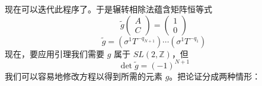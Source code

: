 现在可以迭代此程序了。于是辗转相除法蕴含矩阵恒等式
\begin{equation}
  \tilde g\begin{pmatrix}
    A\\
    C
  \end{pmatrix}=\begin{pmatrix}
    1\\
    0
  \end{pmatrix}
  \tag{C.19}
  \label{eq:C.19}
\end{equation}
\begin{equation}
  \tilde g=(\sigma^1T^{-q_{N+1}})\cdots(\sigma^1T^{-q_1})
  \tag{C.20}
  \label{eq:C.20}
\end{equation}
现在，要应用引理我们需要 $g$ 属于 $SL(2,\mathbb{Z})$，但
\begin{equation}
  \det\tilde g=(-1)^{N+1}
  \tag{C.21}
  \label{eq:C.21}
\end{equation}
我们可以容易地修改方程以得到所需的元素 $g$。把论证分成两种情形：

